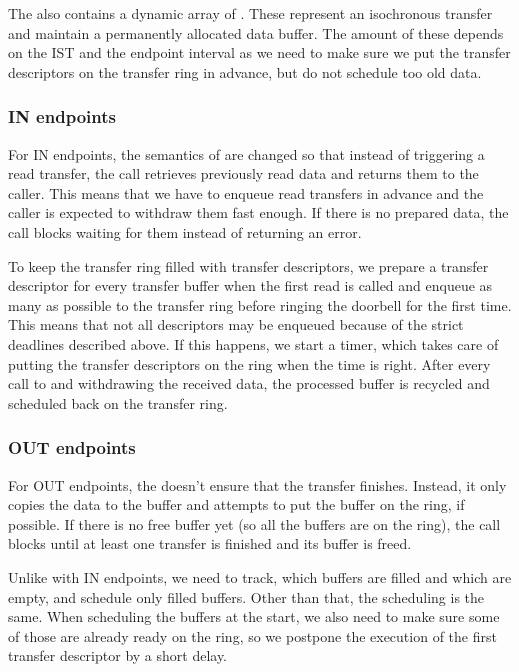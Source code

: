 The  also contains a dynamic array of
. These represent an isochronous transfer and
maintain a permanently allocated data buffer. The amount of these depends on
the IST and the endpoint interval as we need to make sure we put the transfer
descriptors on the transfer ring in advance, but do not schedule too old data.

\subsubsection{IN endpoints}

For IN endpoints, the semantics of  are changed so that instead
of triggering a read transfer, the call retrieves previously read data and
returns them to the caller. This means that we have to enqueue read transfers
in advance and the caller is expected to withdraw them fast enough. If there is
no prepared data, the call blocks waiting for them instead of returning an
error.

To keep the transfer ring filled with transfer descriptors, we prepare a
transfer descriptor for every transfer buffer when the first read is called and
enqueue as many as possible to the transfer ring before ringing the doorbell
for the first time. This means that not all descriptors may be enqueued because
of the strict deadlines described above. If this happens, we start a timer,
which takes care of putting the transfer descriptors on the ring when the time
is right. After every call to  and withdrawing the received data,
the processed buffer is recycled and scheduled back on the transfer ring.

\subsubsection{OUT endpoints}

For OUT endpoints, the  doesn't ensure that the transfer
finishes. Instead, it only copies the data to the buffer and attempts to put
the buffer on the ring, if possible. If there is no free buffer yet (so all the
buffers are on the ring), the call blocks until at least one transfer is
finished and its buffer is freed.

Unlike with IN endpoints, we need to track, which buffers are filled and which
are empty, and schedule only filled buffers. Other than that, the scheduling is
the same. When scheduling the buffers at the start, we also need to make sure
some of those are already ready on the ring, so we postpone the execution of
the first transfer descriptor by a short delay.

